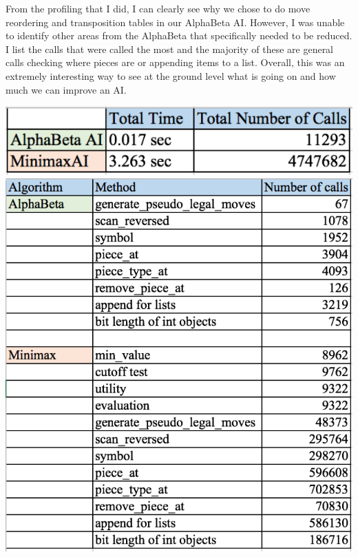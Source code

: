 \documentclass{article}
\begin{document}
From the profiling that I did, I can clearly see why we chose to do move reordering and transposition tables in our AlphaBeta AI. However, I was unable to identify other areas from the AlphaBeta that specifically needed to be reduced. I list the calls that were called the most and the majority of these are general calls checking where pieces are or appending items to a list. Overall, this was an extremely interesting way to see at the ground level what is going on and how much we can improve an AI.



\includegraphics[width=\textwidth]{profiling_total.pdf}
\includegraphics[width=\textwidth]{profiling_individualcalls.pdf}
\end{document}
